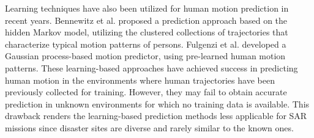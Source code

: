 \documentclass[journal]{IEEEtran}
\newcommand{\todohere}[1]{\hl{(\textbf{TODO:} #1)}}
\begin{document}
	Learning techniques have also been utilized for human motion prediction in recent years. 
	Bennewitz et al. \cite{bennewitz2005learning} proposed a prediction approach based on the hidden Markov model, utilizing the clustered collections of trajectories that characterize typical motion patterns of persons.
	Fulgenzi et al. \cite{fulgenzi2008probabilistic} developed a Gaussian process-based motion predictor, using pre-learned human motion patterns.
	These learning-based approaches have achieved success in predicting human motion in the environments where human trajectories have been previously collected for training.
	However, they may fail to obtain accurate prediction in unknown environments for which no training data is available.
	This drawback renders the learning-based prediction methods less applicable for SAR missions since disaster sites are diverse and rarely similar to the known ones.
	
\end{document}
